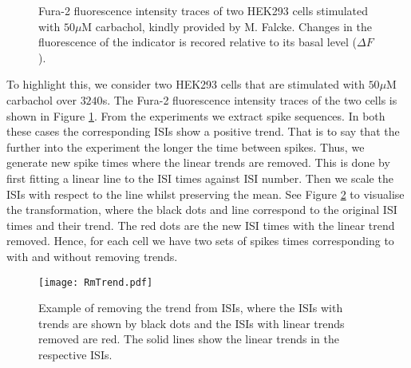 \documentclass[../main.tex]{subfiles}
\begin{document}
 \begin{figure}[b!]
   \hrulefill
   \begin{center} 
     \quad
    \end{center}     
    \caption{Fura-2 fluorescence intensity traces of two HEK293 cells stimulated with  $50\mu\mathrm{M}$ carbachol, kindly provided by M. Falcke. Changes in the fluorescence of the  indicator is recored relative to its basal level ($\Delta F$).}
    \label{fig:tracetrend}
    \hrulefill
    \end{figure}

To highlight this, we consider two HEK293 cells  that are stimulated with $50\mu\mathrm{M}$ carbachol over $3240$s. The Fura-2 fluorescence intensity traces of the two cells is shown in Figure \ref{fig:tracetrend}. From the experiments we extract  spike sequences. In both these cases the corresponding ISIs show a positive trend. That is to say that the further into the experiment the longer the time between  spikes. Thus, we generate new  spike times where the linear trends are removed. This is done by first fitting a linear line to the ISI times against ISI number. Then we scale the ISIs with respect to the line whilst preserving the mean. See Figure \ref{fig:RmTrend} to visualise the transformation, where the black dots and line correspond to the original ISI times and their trend. The red dots are the new ISI times with the linear trend removed. Hence, for each cell we have two sets of  spikes times corresponding to with and without removing trends. 

   \begin{figure}[t!]
   \hrulefill
   \begin{center} 
    {\texttt{[image: RmTrend.pdf]} }
    \end{center}     
    \caption{Example of removing the trend from ISIs, where the ISIs with trends are shown by black dots and the ISIs with linear trends removed are red. The solid lines show the linear trends in the respective ISIs. }
    \label{fig:RmTrend}
    \hrulefill
    \end{figure}
\end{document}
